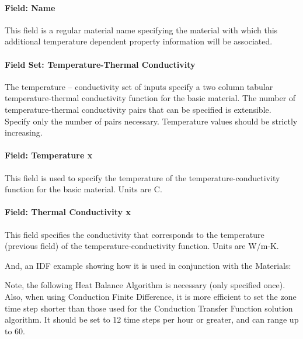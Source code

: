 \paragraph{Field: Name}\label{field-name-6-022}

This field is a regular material name specifying the material with which this additional temperature dependent property information will be associated.

\paragraph{Field Set: Temperature-Thermal Conductivity}\label{field-set-temperature-thermal-conductivity}

The temperature -- conductivity set of inputs specify a two column tabular temperature-thermal conductivity function for the basic material. The number of temperature-thermal conductivity pairs that can be specified is extensible. Specify only the number of pairs necessary. Temperature values should be strictly increasing.

\paragraph{Field: Temperature x}\label{field-temperature-x-1}

This field is used to specify the temperature of the temperature-conductivity function for the basic material. Units are C.

\paragraph{Field: Thermal Conductivity x}\label{field-thermal-conductivity-x}

This field specifies the conductivity that corresponds to the temperature (previous field) of the temperature-conductivity function. Units are W/m-K.

And, an IDF example showing how it is used in conjunction with the Materials:

Note, the following Heat Balance Algorithm is necessary (only specified once). Also, when using Conduction Finite Difference, it is more efficient to set the zone time step shorter than those used for the Conduction Transfer Function solution algorithm. It should be set to 12 time steps per hour or greater, and can range up to 60.

